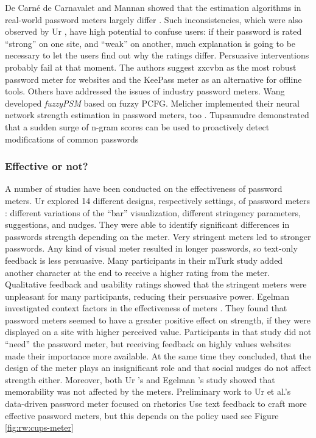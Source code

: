 	De Carné de Carnavalet and Mannan showed that the estimation algorithms in real-world password meters largely differ \cite{DeCarnedeCarnavalet2015PasswordMeters}. Such inconsistencies, which were also observed by Ur \etal \cite{Ur2012HowDoesYourPasswordMeasureUp}, have high potential to confuse users: if their password is rated ``strong'' on one site, and ``weak'' on another, much explanation is going to be necessary to let the users find out why the ratings differ. Persuasive interventions probably fail at that moment. The authors suggest zxcvbn as the most robust password meter for websites and the KeePass meter as an alternative for offline tools. Others have addressed the issues of industry password meters. Wang \etal developed \textit{fuzzyPSM} based on fuzzy \gls{PCFG}. Melicher \etal implemented their neural network strength estimation in password meters, too \cite{Melicher2016NeuralNetworks}. Tupsamudre \etal demonstrated that a sudden surge of n-gram scores can be used to proactively detect modifications of common passwords \cite{Tupsamudre2016MarkovStrength}
	
	\subsubsection{Effective or not?}
	A number of studies have been conducted on the effectiveness of password meters. Ur \etal explored 14 different designs, respectively settings, of password meters \cite{Ur2012HowDoesYourPasswordMeasureUp}: different variations of the ``bar'' visualization, different stringency parameters, suggestions, and nudges. They were able to identify significant differences in passwords strength depending on the meter. Very stringent meters led to stronger passwords. Any kind of visual meter resulted in longer passwords, so text-only feedback is less persuasive. Many participants in their \gls{mTurk} study added another character at the end to receive a higher rating from the meter. Qualitative feedback and usability ratings showed that the stringent meters were unpleasant for many participants, reducing their persuasive power. Egelman \etal investigated context factors in the effectiveness of meters \cite{Egelman2013DoesMyPasswordGoUpToEleven}. They found that password meters seemed to have a greater positive effect on strength, if they were displayed on a site with higher perceived value. Participants in that study did not ``need'' the password meter, but receiving feedback on highly values websites made their importance more available. At the same time they concluded, that the design of the meter plays an insignificant role and that social nudges do not affect strength either. Moreover, both Ur \etal's and Egelman \etal's study showed that memorability was not affected by the meters.
	Preliminary work to Ur et al.'s data-driven password meter focused on rhetorics \cite{Eargle2015YouCanDoBetter}
	Use text feedback to craft more effective password meters, but this depends on the policy used \cite{Ur2017DataDrivenPWMeter}
	see Figure \ref{fig:rw:cups-meter}
	
